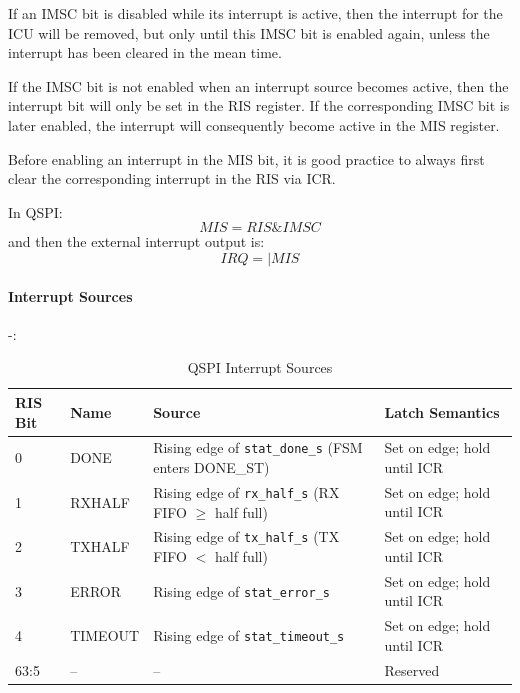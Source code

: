If an IMSC bit is disabled while its interrupt is active, then the interrupt for the ICU will be
removed, but only until this IMSC bit is enabled again, unless the interrupt has been
cleared in the mean time.

If the IMSC bit is not enabled when an interrupt source becomes active, then the interrupt
bit will only be set in the RIS register. If the corresponding IMSC bit is later enabled, the
interrupt will consequently become active in the MIS register.

Before enabling an interrupt in the MIS bit, it is good practice to always first clear the
corresponding interrupt in the RIS via ICR.

In QSPI: \[ MIS = RIS \& IMSC \] and then the external interrupt output is: \[ IRQ =|  MIS \]

\paragraph{Interrupt Sources} -:
\begin{table}[H]
\caption{QSPI Interrupt Sources}
\label{tab:asqspispec_irqsrc}
\centering
\begin{tabularx}{\textwidth}{|l|l|X|X|}
  \hline
  RIS Bit & Name & Source & Latch Semantics \\
  \hline\hline
  0 & DONE     & Rising edge of \texttt{stat\_done\_s} (FSM enters DONE\_ST) & Set on edge; hold until ICR \\
  \hline
  1 & RXHALF   & Rising edge of \texttt{rx\_half\_s} (RX FIFO $\geq$ half full) & Set on edge; hold until ICR \\
  \hline
  2 & TXHALF   & Rising edge of \texttt{tx\_half\_s} (TX FIFO $<$ half full)   & Set on edge; hold until ICR \\
  \hline
  3 & ERROR    & Rising edge of \texttt{stat\_error\_s}                         & Set on edge; hold until ICR \\
  \hline
  4 & TIMEOUT  & Rising edge of \texttt{stat\_timeout\_s}                       & Set on edge; hold until ICR \\
  \hline
  63:5 & --   & --                                                              & Reserved \\
  \hline
\end{tabularx}
\end{table}

